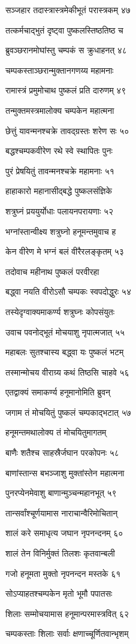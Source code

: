 सञ्जहार तदास्त्रास्त्रमेकीभूतं परास्त्रकम् ४७

तत्कर्मचाद्भुतं दृष्ट्वा पुष्कलस्तिष्ठतिष्ठ च

ब्रुवञ्छरानमोघांस्तु चम्पकं स क्रुधाहनत् ४८

चम्पकस्ताञ्छरान्मुक्तानगणय्य महामनाः

रामास्त्रं प्रमुमोचाथ पुष्कलं प्रति दारुणम् ४९

तन्मुक्तमस्त्रमालोक्य चम्पकेन महात्मना

छेत्तुं यावन्मनश्चक्रे तावद्ग्रस्तः शरेण सः ५०

बद्धश्चम्पकवीरेण रथे स्वे स्थापितः पुनः

पुरं प्रेषयितुं तावन्मनश्चक्रे महामनाः ५१

हाहाकारो महानासीद्बद्धे पुष्कलसंज्ञिके

शत्रुघ्नं प्रययुर्योधाः पलायनपरायणाः ५२

भग्नांस्तान्वीक्ष्य शत्रुघ्नो हनूमन्तमुवाच ह

केन वीरेण मे भग्नं बलं वीरैरलङ्कृतम् ५३

तदोवाच महीनाथ पुष्कलं परवीरहा

बद्ध्वा नयति वीरोऽसौ चम्पकः स्वपदोद्धुरः ५४

तस्येदृग्वाक्यमाकर्ण्य शत्रुघ्नः कोपसंयुतः

उवाच पवनोद्भूतं मोचयाशु नृपात्मजात् ५५

महाबलः सुतश्चास्य बद्ध्वा यः पुष्कलं भटम्

तस्मान्मोचय वीराग्र्य कथं तिष्ठसि चाहवे ५६

एतद्वाक्यं समाकर्ण्य हनूमानोमिति ब्रुवन्

जगाम तं मोचयितुं पुष्कलं चम्पकाद्भटात् ५७

हनूमन्तमथालोक्य तं मोचयितुमागतम्

बाणैः शतैश्च साहस्रैर्जघान परकोपनः ५८

बाणांस्तान्स बभञ्जाशु मुक्तांस्तेन महात्मना

पुनरप्येनमेवाशु बाणान्मुञ्चन्महानभूत् ५९

तान्सर्वांश्चूर्णयामास नाराचान्वैरिमोचितान्

शालं करे समाधृत्य जघान नृपनन्दनम् ६०

शालं तेन विनिर्मुक्तं तिलशः कृतवान्बली

गजो हनूमता मुक्तो नृपनन्दन मस्तके ६१

सोऽप्याहतश्चम्पकेन मृतो भूमौ पपातसः

शिलाः सम्मोचयामास हनूमान्परमास्त्रवित् ६२

चम्पकस्ताः शिलाः सर्वाः क्षणाच्चूर्णितवान्भृशम्

